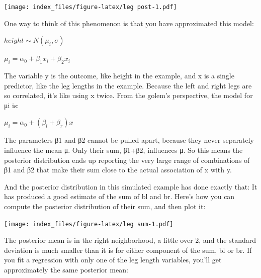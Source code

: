 \documentclass[
]{article}
\newenvironment{Shaded}{\begin{snugshade}}{\end{snugshade}}
\newcommand{\DataTypeTok}[1]{\textcolor[rgb]{0.13,0.29,0.53}{#1}}
\newcommand{\DecValTok}[1]{\textcolor[rgb]{0.00,0.00,0.81}{#1}}
\newcommand{\KeywordTok}[1]{\textcolor[rgb]{0.13,0.29,0.53}{\textbf{#1}}}
\newcommand{\NormalTok}[1]{#1}
\newcommand{\OperatorTok}[1]{\textcolor[rgb]{0.81,0.36,0.00}{\textbf{#1}}}
\newcommand{\StringTok}[1]{\textcolor[rgb]{0.31,0.60,0.02}{#1}}
\begin{document}
\texttt{[image: index\_files/figure-latex/leg post-1.pdf]}

One way to think of this phenomenon is that you have approximated this
model:

\(height \sim N(\mu_i, \sigma)\)

\(\mu_i = \alpha_{0} + \beta_{1} x_{i}+ \beta_{2} x_{i}\)

The variable y is the outcome, like height in the example, and x is a
single predictor, like the leg lengths in the example. Because the left
and right legs are so correlated, it's like using x twice. From the
golem's perspective, the model for μi is:

\(\mu_i = \alpha_{0} + (\beta_{l} + \beta_{r}) x\)

The parameters β1 and β2 cannot be pulled apart, because they never
separately influence the mean μ. Only their sum, β1+β2, influences μ. So
this means the posterior distribution ends up reporting the very large
range of combinations of β1 and β2 that make their sum close to the
actual association of x with y.

And the posterior distribution in this simulated example has done
exactly that: It has produced a good estimate of the sum of bl and br.
Here's how you can compute the posterior distribution of their sum, and
then plot it:

\begin{Shaded}
\end{Shaded}

\texttt{[image: index\_files/figure-latex/leg sum-1.pdf]}

The posterior mean is in the right neighborhood, a little over 2, and
the standard deviation is much smaller than it is for either component
of the sum, bl or br. If you fit a regression with only one of the leg
length variables, you'll get approximately the same posterior mean:
\end{document}
